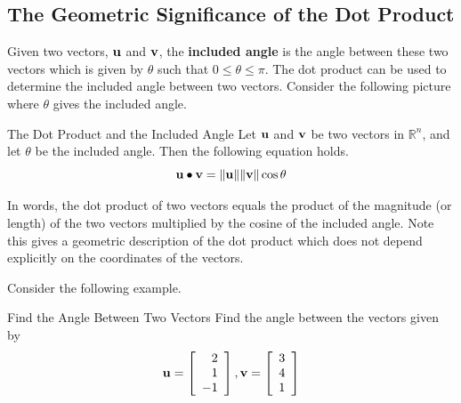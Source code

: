 \subsection{The Geometric Significance of the Dot Product}

Given two vectors, $\mathbf{u}$ and $\mathbf{v}$, the \textbf{included angle}
  is the angle between these two vectors which
is given by $\theta$ such that $0 \leq \theta \leq \pi$. The dot product can be used to
determine the included angle between two vectors. Consider the following picture where $\theta$ gives the included angle. 

\begin{center}
\par{}\label{fig:RnVectorsDotProductSignificance-tikz01}%

\end{center}

\begin{proposition}{The Dot Product and the Included Angle}\label{prop:dotproductangle}
Let $\mathbf{u}$ and $\mathbf{v}$ be two vectors in $\mathbb{R}^n$, and let 
$\theta$ be the included angle. Then the following equation holds.
\begin{equation*}
\mathbf{u}\bullet \mathbf{v}=\| \mathbf{u}\| \| \mathbf{v}
\| \cos \theta 
\end{equation*}
\end{proposition}

In words, the dot product of two vectors equals the product of
the magnitude (or length) of the two vectors multiplied by the cosine of the included
angle. Note this gives a geometric description of the dot product which does
not depend explicitly on the coordinates of the vectors.

Consider the following example.

\begin{example}{Find the Angle Between Two Vectors}\label{exa:angletwovectors}
Find the angle between the vectors given by 
\begin{equation*}
\mathbf{u}
=
\left[
\begin{array}{r}
2 \\
1 \\
-1 
\end{array}
\right], 
\mathbf{v}
=
\left[
\begin{array}{r}
3 \\
4 \\
1
\end{array}
\right]
\end{equation*}
\end{example}


